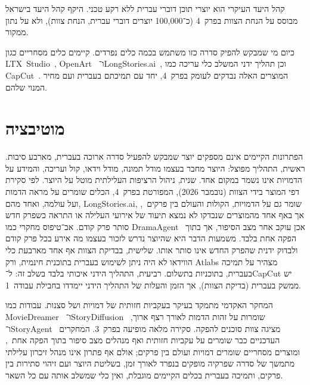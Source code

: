 קהל היעד העיקרי הוא יוצרי תוכן דוברי עברית ללא רקע טכני. היקף קהל היעד בישראל מבוסס על הנחת הצוות בפרק~4 (כ־100,000 יוצרים דוברי עברית, הנחת צוות), ולא על נתון ממקור.

כיום מי שמבקש להפיק סדרה כזו משתמש בכמה כלים נפרדים. קיימים כלים מסחריים כגון \mbox{\textenglish{LTX Studio}}~\cite{ltxstudio}, \textenglish{OpenArt}~\cite{openart} ו־\textenglish{LongStories.ai}~\cite{longstories}, וכן תהליך ידני המשלב כלי עריכה כמו \textenglish{CapCut}~\cite{capcut}. המוצרים האלה נבדקים לעומק בפרק~4, יחד עם תמיכתם בעברית ועם מחיר המנוי שלהם.

\section{מוטיבציה}
הפתרונות הקיימים אינם מספקים יוצר שמבקש להפעיל סדרה ארוכה בעברית, מארבע סיבות. ראשית, התהליך מפוצל: היוצר מחבר בעצמו מודל תמונה, מודל וידאו, קול ועריכה, והמידע על הדמויות אינו נשמר במקום אחד. שנית, ניהול הרציפות העלילתית מוטל על היוצר. לפי סקירת דפי המוצר בידי הצוות (נובמבר 2026), המפורטת בפרק~4, הכלים שומרים על מראה הדמות ועל עולמה, ואחד מהם, \textenglish{LongStories.ai}, שומר גם על הדמויות, הקולות והעולם בין פרקים~\cite{longstories}, אך באף אחד מהמוצרים שנבדקו לא נמצא תיעוד של אירועי העלילה או התראה כשפרק חדש סותר פרק קודם. אב־טיפוס מחקרי כמו \textenglish{DramaAgent}~\cite{huang2026dramaagent} אכן עוקב אחר מצב הסיפור, אך בתוך הפקה אחת בלבד. משמעות הדבר היא שהיוצר נדרש לזכור בעצמו מה אירע בכל פרק קודם ולבדוק ידנית שהפרק החדש אינו סותר אותו. שלישית, בבדיקת הצוות אף אחד מארבעת כלי הווידאו לא היה ניתן לשימוש בעברית בתוכנית חינמית, ורק \textenglish{Atlabs}\cite{atlabs} מצהיר על תמיכה בעברית, בתוכניות בתשלום. רביעית, התהליך הידני איכותי בלבד בשלב זה: ל־\textenglish{CapCut} יש ממשק בעברית (בדיקת הצוות), אך הזמן והעלות של התהליך הידני יימדדו בחבילת עבודה~1.

המחקר האקדמי מתמקד בעיקר בעקביות חזותית של דמויות ושל סצנות. עבודות כמו \textenglish{MovieDreamer}~\cite{zhao2025moviedreamer} ו־\textenglish{StoryDiffusion}~\cite{zhou2024storydiffusion} שומרות על זהות הדמות לאורך רצף ארוך, ו־\textenglish{StoryAgent}~\cite{hu2024storyagent} מציגה צוות סוכנים להפקה. סקירה מלאה מופיעה בפרק~3. המחקרים העדכניים כבר שומרים על עקביות חזותית ואף מנהלים מצב סיפור בתוך הפקה אחת~\cite{huang2026dramaagent}, ומוצרים מסחריים שומרים דמויות ועולם בין פרקים; אולם אף פתרון אינו מנהל זיכרון עלילתי מתמשך של סדרה שפרקיה מופקים בנפרד לאורך זמן, בשליטת היוצר ועם זיהוי סתירות בין פרקים, ותמיכה בעברית בכלים הקיימים מוגבלת, ואין כלי שמשלב אותה עם כל השאר.

